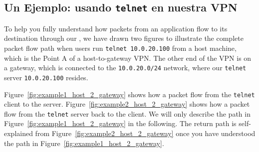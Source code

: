 \subsection{Un Ejemplo: usando {\tt telnet} en nuestra VPN} 

To help you fully understand how packets from an application flow to its destination
through our \miniVPN, we have drawn two figures to illustrate the complete 
packet flow path when users run {\tt telnet 10.0.20.100} from a host machine,
which is the Point A of a host-to-gateway VPN. The other end of the VPN is 
on a gateway, which is connected to the {\tt 10.0.20.0/24} network, where 
our {\tt telnet} server {\tt 10.0.20.100} resides. 


Figure~\ref{fig:example1_host_2_gateway} shows how a packet flow 
from the {\tt telnet} client to the server. 
Figure~\ref{fig:example2_host_2_gateway} shows how a packet flow 
from the {\tt telnet} server back to the client. 
We will only describe the path in Figure~\ref{fig:example1_host_2_gateway}
in the following. The return path is self-explained from
Figure~\ref{fig:example2_host_2_gateway} once you have understood 
the path in Figure~\ref{fig:example1_host_2_gateway}. 
